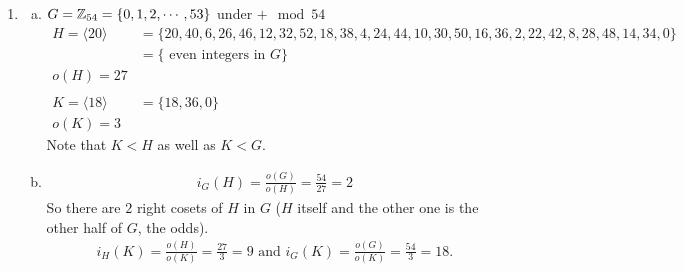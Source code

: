 \begin{enumerate}
\begin{enumerate}[a)]
    \item In $S_3$ $N(I)=S_3$ since every element commutes with $I$. \\
    $N(\sigma) = \{I, \sigma \}$ \\
    $N(\tau) = \{I, \tau \}$ \\
    $N(\sigma \tau) = \{I, \sigma\tau, \tau\sigma \}$ \\
    $N( \tau \sigma) = \{I, \tau\sigma, \sigma\tau \}$ \\
    $N(\sigma \tau \sigma) = \{I, \sigma \tau \sigma \}$
    \begin{tcolorbox}
        Note that $N(a)$ always contains $e$ and $a$ and the order of $N(a)$ must divide $o(G)$ \\ (part (a) with Lagrange). 
    \end{tcolorbox}
    \item If $G$ is abelian then $\forall \ a \in G, \ N(a)=G $ because  element commutes with $a$. So in an abelian group $G$ ALL the normalizers equal $G$ (i.e. are trivial subgroups).
\end{enumerate}

\item 
\begin{enumerate}[a)]
    \item $G = {\mathbb{Z}}_{54} = \{0,1,2, \cdots, 53 \}$ under $+ \mod 54$
    \begin{align*}
        H =\langle 20 \rangle &= \{20, 40, 6, 26, 46, 12, 32, 52, 18, 38, 4, 24, 44, 10, 30, 50, 16, 36, 2, 22, 42, 8, 28, 48, 14, 34, 0\}  \\ 
        &= \{ \text{ even integers in }G \} \\
        o(H) = 27 \\
        \\
        K = \langle 18 \rangle &= \{18, 36, 0 \} \\
        o(K)= 3 
    \end{align*}
    Note that $K<H$ as well as $K<G$.

    \item 
    \begin{align*}
        i_G(H)= \frac{o(G)}{o(H)}= \frac{54}{27} = 2    
    \end{align*}
    So there are $2$ right cosets of $H$ in $G$ ($H$ itself and the other one is the other half of $G$, the odds).
    \begin{align*}
        i_H(K)= \frac{o(H)}{o(K)} = \frac{27}{3} = 9 \text{ and } i_G(K) = \frac{o(G)}{o(K)}= \frac{54}{3} = 18.
    \end{align*}


\end{enumerate}
\end{enumerate}

